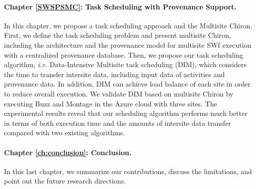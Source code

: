 \paragraph{Chapter \ref{SWSPSMC}: Task Scheduling with Provenance Support.} In this chapter, we propose a task scheduling approach and the Multisite Chiron. First, we define the task scheduling problem and present multisite Chiron, including the architecture and the provenance model for multisite SWf execution with a centralized provenance database. Then, we propose our task scheduling algorithm, \textit{i.e.} Data-Intensive Multisite task scheduling (DIM), which considers the time to transfer intersite data, including input data of activities and provenance data. In addition, DIM can achieve load balance of each site in order to reduce overall execution. We validate DIM based on multisite Chiron by executing Buzz and Montage in the Azure cloud with three sites. The experimental results reveal that our scheduling algorithm performs much better in terms of both execution time and the amounts of intersite data transfer compared with two existing algorithms. 

\paragraph{Chapter \ref{ch:conclusion}: Conclusion.} In this last chapter, we summarize our contributions, discuss the limitations, and point out the future research directions.


